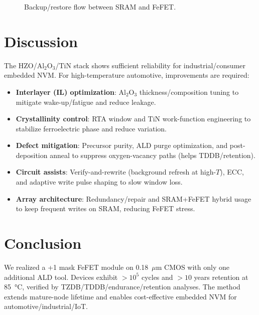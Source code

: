 \documentclass[conference]{IEEEtran}
\begin{document}
\begin{figure}[!t]
  \centering
  \caption{Backup/restore flow between SRAM and FeFET.}
  \label{fig:backup_flow}
\end{figure}

\section{Discussion}
The HZO/Al$_2$O$_3$/TiN stack shows sufficient reliability for industrial/consumer embedded NVM.
For high-temperature automotive, improvements are required:
\begin{itemize}
  \item \textbf{Interlayer (IL) optimization}: Al$_2$O$_3$ thickness/composition tuning to mitigate wake-up/fatigue and reduce leakage.
  \item \textbf{Crystallinity control}: RTA window and TiN work-function engineering to stabilize ferroelectric phase and reduce variation.
  \item \textbf{Defect mitigation}: Precursor purity, ALD purge optimization, and post-deposition anneal to suppress oxygen-vacancy paths (helps TDDB/retention).
  \item \textbf{Circuit assists}: Verify-and-rewrite (background refresh at high-$T$), ECC, and adaptive write pulse shaping to slow window loss.
  \item \textbf{Array architecture}: Redundancy/repair and SRAM+FeFET hybrid usage to keep frequent writes on SRAM, reducing FeFET stress.
\end{itemize}

\section{Conclusion}
We realized a +1 mask FeFET module on 0.18~$\mu$m CMOS with only one additional ALD tool.
Devices exhibit $>10^5$ cycles and $>10$ years retention at \SI{85}{\celsius}, verified by TZDB/TDDB/endurance/retention analyses.
The method extends mature-node lifetime and enables cost-effective embedded NVM for automotive/industrial/IoT.
\end{document}

